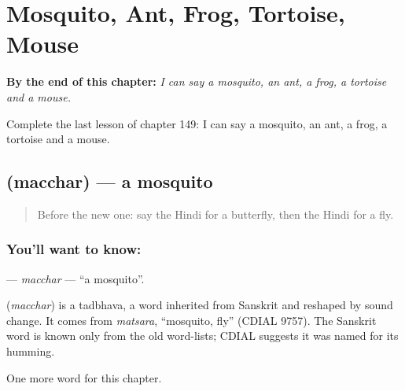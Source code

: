 
\chapter{Mosquito, Ant, Frog, Tortoise, Mouse}
\label{ch:hi-mosquito-ant-frog-tortoise-mouse}

\begin{chapteropening}
\textbf{By the end of this chapter:} \emph{I can say a mosquito, an ant, a frog, a tortoise and a mouse.}

Complete the last lesson of chapter 149: I can say a mosquito, an ant, a frog, a tortoise and a mouse.
\end{chapteropening}

\section[\texorpdfstring{\hi{मच्छर} (macchar)}{मच्छर (macchar)}]{ (macchar) — a mosquito}

\label{lesson:HI-C149-macchar}



\begin{quote}
Before the new one: say the Hindi for a butterfly, then the Hindi for a fly.
\end{quote}

\subsection*{You'll want to know: }
\textbf{} — \emph{macchar} — \textquotedblleft{}a mosquito\textquotedblright{}.

\begin{cousinweb}
\textbf{} (\emph{macchar}) is a tadbhava, a word inherited from Sanskrit and reshaped by sound change. It comes from \emph{matsara}, \textquotedblleft{}mosquito, fly\textquotedblright{} (CDIAL 9757). The Sanskrit word is known only from the old word-lists; CDIAL suggests it was named for its humming.
\end{cousinweb}

\begin{grammarlens}[title={What you've built}]
One more word for this chapter.
\end{grammarlens}


